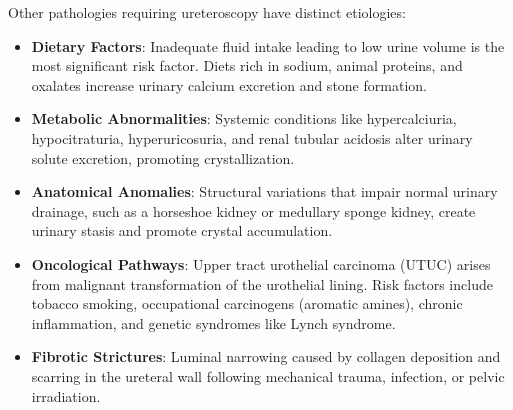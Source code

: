 Other pathologies requiring ureteroscopy have distinct etiologies:
\begin{itemize}
\item \textbf{Dietary Factors}: Inadequate fluid intake leading to low urine volume is the most significant risk factor. Diets rich in sodium, animal proteins, and oxalates increase urinary calcium excretion and stone formation.
\item \textbf{Metabolic Abnormalities}: Systemic conditions like hypercalciuria, hypocitraturia, hyperuricosuria, and renal tubular acidosis alter urinary solute excretion, promoting crystallization.
\item \textbf{Anatomical Anomalies}: Structural variations that impair normal urinary drainage, such as a horseshoe kidney or medullary sponge kidney, create urinary stasis and promote crystal accumulation.
\item \textbf{Oncological Pathways}: Upper tract urothelial carcinoma (UTUC) arises from malignant transformation of the urothelial lining. Risk factors include tobacco smoking, occupational carcinogens (aromatic amines), chronic inflammation, and genetic syndromes like Lynch syndrome.
\item \textbf{Fibrotic Strictures}: Luminal narrowing caused by collagen deposition and scarring in the ureteral wall following mechanical trauma, infection, or pelvic irradiation.
\end{itemize}

